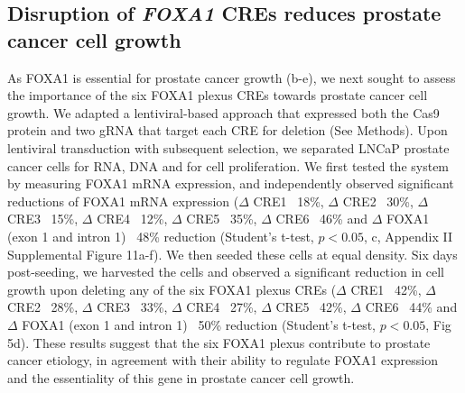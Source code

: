 
\subsection{Disruption of \emph{FOXA1} CREs reduces prostate cancer cell growth}

As FOXA1 is essential for prostate cancer growth (b-e), we next sought to assess the importance of the six FOXA1 plexus CREs towards prostate cancer cell growth.
We adapted a lentiviral-based approach that expressed both the Cas9 protein and two gRNA that target each CRE for deletion (See Methods).
Upon lentiviral transduction with subsequent selection, we separated LNCaP prostate cancer cells for RNA, DNA and for cell proliferation.
We first tested the system by measuring FOXA1 mRNA expression, and independently observed significant reductions of FOXA1 mRNA expression ($\Delta$ CRE1 ~18\%, $\Delta$ CRE2 ~30\%, $\Delta$ CRE3 ~15\%, $\Delta$ CRE4 ~12\%, $\Delta$ CRE5 ~35\%, $\Delta$ CRE6 ~46\% and $\Delta$ FOXA1 (exon 1 and intron 1) ~48\% reduction (Student’s t-test, $p<0.05$, c, Appendix II Supplemental Figure 11a-f).
We then seeded these cells at equal density.
Six days post-seeding, we harvested the cells and observed a significant reduction in cell growth upon deleting any of the six FOXA1 plexus CREs ($\Delta$ CRE1 ~42\%, $\Delta$ CRE2 ~28\%, $\Delta$ CRE3 ~33\%, $\Delta$ CRE4 ~27\%, $\Delta$ CRE5 ~42\%, $\Delta$ CRE6 ~44\% and $\Delta$ FOXA1 (exon 1 and intron 1) ~50\% reduction (Student’s t-test, $p<0.05$, Fig 5d).
These results suggest that the six FOXA1 plexus contribute to prostate cancer etiology, in agreement with their ability to regulate FOXA1 expression and the essentiality of this gene in prostate cancer cell growth.


